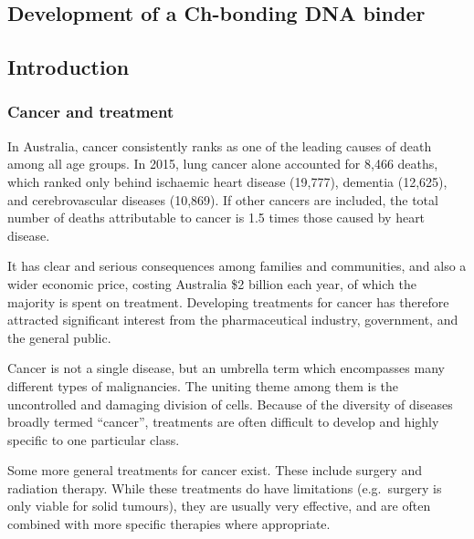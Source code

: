 \begin{refsection}

\chapter{Development of a Ch-bonding DNA binder}\label{ch:dna-binder}

\section{Introduction}

\subsection{Cancer and treatment}
In Australia, cancer consistently ranks as one of the leading causes of death among all age groups. In 2015, lung cancer alone accounted for 8,466 deaths, which ranked only behind ischaemic heart disease (19,777), dementia (12,625), and cerebrovascular diseases (10,869).
If other cancers are included, the total number of deaths attributable to cancer is 1.5 times those caused by heart disease\autocite{abs2015}.

It has clear and serious consequences among families and communities, and also a wider economic price, costing Australia \$2 billion each year, of which the majority is spent on treatment\autocite{Mathers1998}.
Developing treatments for cancer has therefore attracted significant interest from the pharmaceutical industry, government, and the general public\autocite{Rankin2015}.

Cancer is not a single disease, but an umbrella term which encompasses many different types of malignancies.
The uniting theme among them is the uncontrolled and damaging division of cells.
Because of the diversity of diseases broadly termed ``cancer'', treatments are often difficult to develop and highly specific to one particular class\autocite{Hanahan2011}.

Some more general treatments for cancer exist.
These include surgery and radiation therapy.
While these treatments do have limitations (e.g.\ surgery is only viable for solid tumours), they are usually very effective, and are often combined with more specific therapies where appropriate.



\end{refsection}
